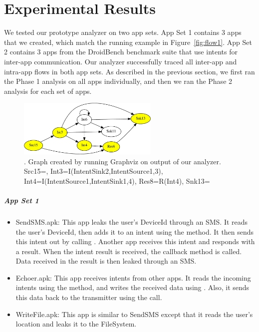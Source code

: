 {\chapter{Experimental Results} \label{subsec:experimental}
We tested our prototype analyzer on two app sets. App Set 1 contains 3 apps that we created, which match the running example in Figure~\ref{fig:flow1}.  App Set 2 contains 3 apps from the DroidBench benchmark suite \cite{ecspride2014droidbench} that use intents for inter-app communication.
Our analyzer successfully traced all inter-app and intra-app flows in both app sets. As described in the previous section, we first ran the Phase 1 analysis on all apps individually, and then we ran the Phase 2 analysis for each set of apps.

\begin{figure}
\center
\vspace{-2ex}
\includegraphics[width=0.6\textwidth]{droidbench-graph-crop.pdf}
\caption[Tainted data flow in DroidBench apps]{.  
Graph created by running Graphviz on output of our analyzer.
Src15=, 
Int3=I(IntentSink2,IntentSource1,3),
Int4=I(IntentSource1,IntentSink1,4), 
Res8=R(Int4),
Snk13=
}
\label{fig:droidbench-graph}
\end{figure}

\paragraph{App Set 1}
\begin{sloppypar}
\begin{itemize}
\item
SendSMS.apk: This app leaks the user's DeviceId through an SMS. It reads the user's DeviceId, then adds it to an intent using the  method. It then sends this intent out by calling . Another app receives this intent and responds with a result. When the intent result is received, the  callback method is called. Data received in the result is then leaked through an SMS.
\item
Echoer.apk: This app receives intents from other apps. It reads the incoming intents using the  method, and writes the received data using . Also, it sends this data back to the transmitter using the  call.
\item
WriteFile.apk: This app is similar to SendSMS except that it reads the user's location and leaks it to the FileSystem.

\end{itemize}
\end{sloppypar}}
